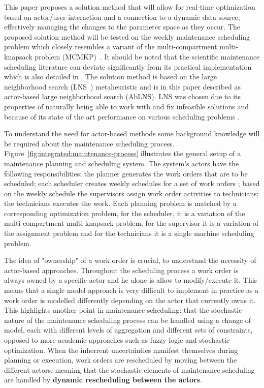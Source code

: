 This paper proposes a solution method that will allow for real-time
optimization based on actor/user interaction and a connection to a dynamic
data source, effectively managing the changes to the parameter space as
they occur. The proposed solution method will be tested on the weekly
maintenance scheduling problem \citep{palmerMaintenancePlanningScheduling2019}
which closely resembles a variant of the multi-compartment multi-knapsack
problem (MCMKP)~\citep{do2007constrained}. It should be noted that the
scientific maintenance scheduling literature can deviate significantly
from its practical implementation which is also detailed in
\citep{palmerMaintenancePlanningScheduling2019}. The solution method is based
on the large neighborhood search (LNS~\citep{shaw1998using}) metaheuristic and
is in this paper described as actor-based large neighborhood search (AbLNS). LNS
was chosen due to its properties of naturally being able to work with and fix
infeasible solutions and because of its state of the art performance on various
scheduling problems \citep{gendreauHandbookMetaheuristics2019}.

To understand the need for actor-based methods some
background knowledge will be required about the maintenance scheduling process.
Figure~\ref{fig:integrated:maintenance-process} illustrates the general setup
of a maintenance planning and scheduling system. The system's actors
have the following responsibilities: the planner generates the work orders that
are to be scheduled; each scheduler creates weekly schedules for a set of work orders ; 
based on the weekly schedule the supervisors assign work order
activities to technicians; the
technicians executes the work. Each planning problem is matched 
by a corresponding optimization problem, for the scheduler, it is a variation of the
multi-compartment multi-knapsack problem, for the supervisor it is a variation of the 
assignment problem and for the technicians it is a single machine scheduling problem.

The idea of "ownership" of a work order is crucial, to understand the necessity of
actor-based approaches. Throughout the scheduling process a
work order is always owned by a specific actor and he alone is allow to modify/execute it. This
means that a single model approach is very difficult to implement in practice
as a work order is modelled differently depending on the actor that currently
owns it. This highlights another point in maintenance scheduling: that
the stochastic nature of the maintenance scheduling process can be handled using
a change of model, each with different levels of aggregation and different sets
of constraints, opposed to more academic approaches such as fuzzy logic and
stochastic optimization. When the inherrent uncertainties manifest themselves
during planning or execution, work orders are rescheduled by moving between
the different actors, meaning that the stochastic elements of maintenance
scheduling are handled by \textbf{dynamic rescheduling between the actors}.

